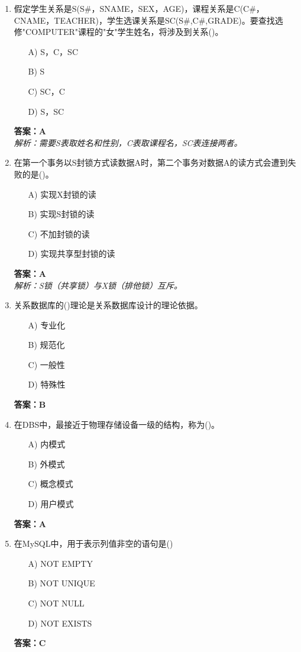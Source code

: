 \documentclass[a4paper,12pt]{article}
\begin{document}
\begin{enumerate}[label=\arabic*.]
\item 假定学生关系是S(S\#，SNAME，SEX，AGE)，课程关系是C(C\#，CNAME，TEACHER)，学生选课关系是SC(S\#,C\#,GRADE)。要查找选修"COMPUTER"课程的"女"学生姓名，将涉及到关系()。
\begin{itemize}
    \item[A)] S，C，SC
    \item[B)] S
    \item[C)] SC，C
    \item[D)] S，SC
\end{itemize}
\textbf{答案：A} \\
\textit{解析：需要S表取姓名和性别，C表取课程名，SC表连接两者。}

\item 在第一个事务以S封锁方式读数据A时，第二个事务对数据A的读方式会遭到失败的是()。
\begin{itemize}
    \item[A)] 实现X封锁的读
    \item[B)] 实现S封锁的读
    \item[C)] 不加封锁的读
    \item[D)] 实现共享型封锁的读
\end{itemize}
\textbf{答案：A} \\
\textit{解析：S锁（共享锁）与X锁（排他锁）互斥。}

\item 关系数据库的()理论是关系数据库设计的理论依据。
\begin{itemize}
    \item[A)] 专业化
    \item[B)] 规范化
    \item[C)] 一般性
    \item[D)] 特殊性
\end{itemize}
\textbf{答案：B}

\item 在DBS中，最接近于物理存储设备一级的结构，称为()。
\begin{itemize}
    \item[A)] 内模式
    \item[B)] 外模式
    \item[C)] 概念模式
    \item[D)] 用户模式
\end{itemize}
\textbf{答案：A}

\item 在MySQL中，用于表示列值非空的语句是()
\begin{itemize}
    \item[A)] NOT EMPTY
    \item[B)] NOT UNIQUE
    \item[C)] NOT NULL
    \item[D)] NOT EXISTS
\end{itemize}
\textbf{答案：C}


\end{enumerate}
\end{document}
